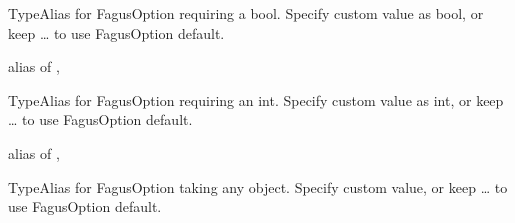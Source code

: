 \documentclass[a4paper,10pt,english]{sphinxmanual}
\begin{document}

\begin{fulllineitems}
\label{\detokenize{fagus.utils:fagus.utils.OptBool}}
\pysigstartsignatures
{}
\pysigstopsignatures
\sphinxAtStartPar
TypeAlias for FagusOption requiring a bool. Specify custom value as bool, or keep … to use FagusOption default.

\sphinxAtStartPar
alias of \sphinxcode{\sphinxupquote{Union}}{[}, \sphinxcode{\sphinxupquote{ellipsis}}{]}

\end{fulllineitems}


\begin{fulllineitems}
\label{\detokenize{fagus.utils:fagus.utils.OptInt}}
\pysigstartsignatures
{}
\pysigstopsignatures
\sphinxAtStartPar
TypeAlias for FagusOption requiring an int. Specify custom value as int, or keep … to use FagusOption default.

\sphinxAtStartPar
alias of \sphinxcode{\sphinxupquote{Union}}{[}, \sphinxcode{\sphinxupquote{ellipsis}}{]}

\end{fulllineitems}


\begin{fulllineitems}
\label{\detokenize{fagus.utils:fagus.utils.OptAny}}
\pysigstartsignatures
{}
\pysigstopsignatures
\sphinxAtStartPar
TypeAlias for FagusOption taking any object. Specify custom value, or keep … to use FagusOption default.

\end{fulllineitems}


\sphinxstepscope
\end{document}
